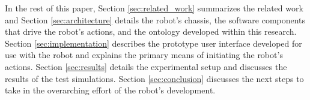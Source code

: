In the rest of this paper, Section \ref{sec:related_work} summarizes the related work and Section \ref{sec:architecture} details the robot's chassis, the software components that drive the robot's actions, and the ontology developed within this research. Section \ref{sec:implementation} describes the prototype user interface developed for use with the robot and explains the primary means of initiating the robot's actions. Section \ref{sec:results} details the experimental setup and discusses the results of the test simulations. Section \ref{sec:conclusion} discusses the next steps to take in the overarching effort of the robot's development.


